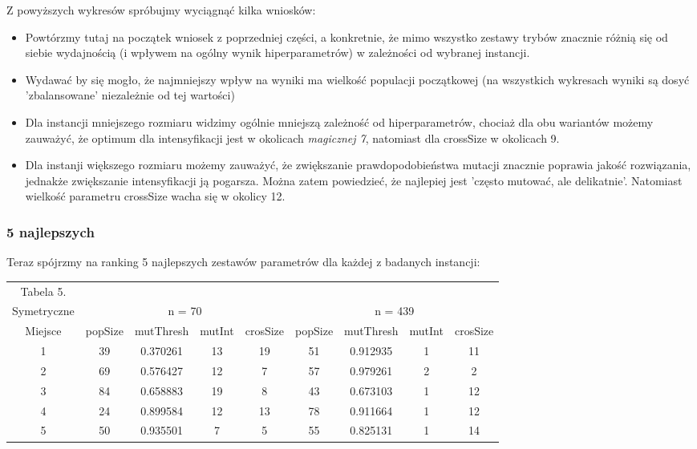 \documentclass{article}
\begin{document}
Z powyższych wykresów spróbujmy wyciągnąć kilka wniosków:
\begin{itemize}
	\item Powtórzmy tutaj na początek wniosek z poprzedniej części, a konkretnie, że mimo wszystko zestawy trybów znacznie różnią się od siebie wydajnością (i wpływem na ogólny wynik hiperparametrów) w zależności od wybranej instancji.
	\item Wydawać by się mogło, że najmniejszy wpływ na wyniki ma wielkość populacji początkowej (na wszystkich wykresach wyniki są dosyć 'zbalansowane' niezależnie od tej wartości)
	\item Dla instancji mniejszego rozmiaru widzimy ogólnie mniejszą zależność od hiperparametrów, chociaż dla obu wariantów możemy zauważyć, że optimum dla intensyfikacji jest w okolicach \textit{magicznej 7}, natomiast dla crossSize w okolicach 9.
	\item Dla instanji większego rozmiaru możemy zauważyć, że zwiększanie prawdopodobieństwa mutacji znacznie poprawia jakość rozwiązania, jednakże zwiększanie intensyfikacji ją pogarsza. Można zatem powiedzieć, że najlepiej jest 'często mutować, ale delikatnie'. Natomiast wielkość parametru crossSize wacha się w okolicy 12.
\end{itemize}

\subsubsection{5 najlepszych}
Teraz spójrzmy na ranking 5 najlepszych zestawów parametrów dla każdej z badanych instancji:

\begin{table}[h!]
	\centering
	\begin{tabular}{c||c|c|c|c||c|c|c|c}
Tabela 5.\\
Symetryczne & \multicolumn{4}{c}{n = 70} &\multicolumn{4}{c}{n = 439}\\
Miejsce & popSize & mutThresh & mutInt & crosSize & popSize & mutThresh & mutInt & crosSize \\
\hline
1 & 39 & 0.370261 & 13 & 19 & 51 & 0.912935 & 1 & 11 \\
2 & 69 & 0.576427 & 12 & 7 & 57 & 0.979261 & 2 & 2 \\
3 & 84 & 0.658883 & 19 & 8 & 43 & 0.673103 & 1 & 12 \\
4 & 24 & 0.899584 & 12 & 13 & 78 & 0.911664 & 1 & 12 \\
5 & 50 & 0.935501 & 7 & 5 & 55 & 0.825131 & 1 & 14 \\

	\end{tabular}
\end{table}
\end{document}
